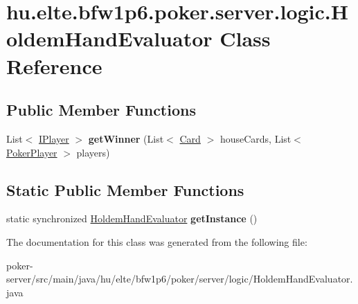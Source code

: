 \hypertarget{classhu_1_1elte_1_1bfw1p6_1_1poker_1_1server_1_1logic_1_1_holdem_hand_evaluator}{}\section{hu.\+elte.\+bfw1p6.\+poker.\+server.\+logic.\+Holdem\+Hand\+Evaluator Class Reference}
\label{classhu_1_1elte_1_1bfw1p6_1_1poker_1_1server_1_1logic_1_1_holdem_hand_evaluator}
\subsection*{Public Member Functions}
\begin{DoxyCompactItemize}
\item 
\hypertarget{classhu_1_1elte_1_1bfw1p6_1_1poker_1_1server_1_1logic_1_1_holdem_hand_evaluator_a7d5ed9337f66f3a3c38dc6b81133e9d0}{}List$<$ \hyperlink{interfacecom_1_1cantero_1_1games_1_1poker_1_1texasholdem_1_1_i_player}{I\+Player} $>$ {\bfseries get\+Winner} (List$<$ \hyperlink{classcom_1_1cantero_1_1games_1_1poker_1_1texasholdem_1_1_card}{Card} $>$ house\+Cards, List$<$ \hyperlink{classhu_1_1elte_1_1bfw1p6_1_1poker_1_1model_1_1entity_1_1_poker_player}{Poker\+Player} $>$ players)\label{classhu_1_1elte_1_1bfw1p6_1_1poker_1_1server_1_1logic_1_1_holdem_hand_evaluator_a7d5ed9337f66f3a3c38dc6b81133e9d0}

\end{DoxyCompactItemize}
\subsection*{Static Public Member Functions}
\begin{DoxyCompactItemize}
\item 
\hypertarget{classhu_1_1elte_1_1bfw1p6_1_1poker_1_1server_1_1logic_1_1_holdem_hand_evaluator_a92ccc62d1c1e3caf2e69edf392a69e1e}{}static synchronized \hyperlink{classhu_1_1elte_1_1bfw1p6_1_1poker_1_1server_1_1logic_1_1_holdem_hand_evaluator}{Holdem\+Hand\+Evaluator} {\bfseries get\+Instance} ()\label{classhu_1_1elte_1_1bfw1p6_1_1poker_1_1server_1_1logic_1_1_holdem_hand_evaluator_a92ccc62d1c1e3caf2e69edf392a69e1e}

\end{DoxyCompactItemize}


The documentation for this class was generated from the following file\+:\begin{DoxyCompactItemize}
\item 
poker-\/server/src/main/java/hu/elte/bfw1p6/poker/server/logic/Holdem\+Hand\+Evaluator.\+java\end{DoxyCompactItemize}

